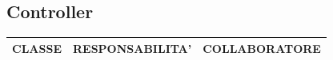 \documentclass[11pt]{article}
\begin{document}
	\subsection{Controller}

	\begin{table}[h]
		\centering
		\begin{adjustbox}{max width=\textwidth}
			\begin{tabular}{|l|l|l|} \hline
			CLASSE  & RESPONSABILITA'                                                                                                                                                                                        & COLLABORATORE                                                                                                                                                                                                                                                                                                                                                                                                                                                                                                                                                                                                                                              \\\hline
			\hline

\end{tabular}
\end{adjustbox}
\end{table}
\end{document}
